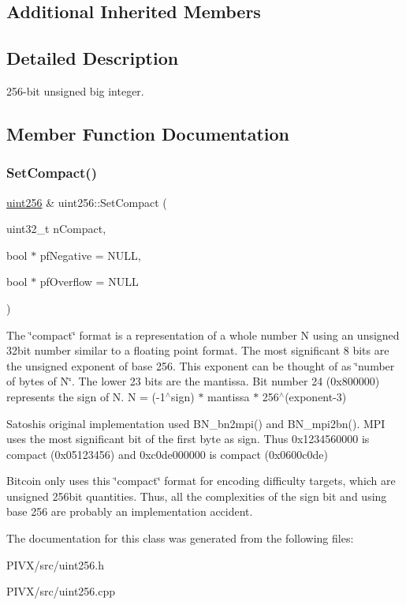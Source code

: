 \subsection*{Additional Inherited Members}


\subsection{Detailed Description}
256-\/bit unsigned big integer. 

\subsection{Member Function Documentation}
\mbox{\label{classuint256_a54bc91c8535c43f881bba1fdb11ca7fa}} 
\subsubsection{\texorpdfstring{Set\+Compact()}{SetCompact()}}
{\footnotesize\ttfamily \mbox{\hyperlink{classuint256}{uint256}} \& uint256\+::\+Set\+Compact (\begin{DoxyParamCaption}\item[{uint32\+\_\+t}]{n\+Compact,  }\item[{bool $\ast$}]{pf\+Negative = {\ttfamily NULL},  }\item[{bool $\ast$}]{pf\+Overflow = {\ttfamily NULL} }\end{DoxyParamCaption})}

The \char`\"{}compact\char`\"{} format is a representation of a whole number N using an unsigned 32bit number similar to a floating point format. The most significant 8 bits are the unsigned exponent of base 256. This exponent can be thought of as \char`\"{}number of bytes of N\char`\"{}. The lower 23 bits are the mantissa. Bit number 24 (0x800000) represents the sign of N. N = (-\/1$^\wedge$sign) $\ast$ mantissa $\ast$ 256$^\wedge$(exponent-\/3)

Satoshi\textquotesingle{}s original implementation used B\+N\+\_\+bn2mpi() and B\+N\+\_\+mpi2bn(). M\+PI uses the most significant bit of the first byte as sign. Thus 0x1234560000 is compact (0x05123456) and 0xc0de000000 is compact (0x0600c0de)

Bitcoin only uses this \char`\"{}compact\char`\"{} format for encoding difficulty targets, which are unsigned 256bit quantities. Thus, all the complexities of the sign bit and using base 256 are probably an implementation accident. 

The documentation for this class was generated from the following files\+:\begin{DoxyCompactItemize}
\item 
P\+I\+V\+X/src/uint256.\+h\item 
P\+I\+V\+X/src/uint256.\+cpp\end{DoxyCompactItemize}
